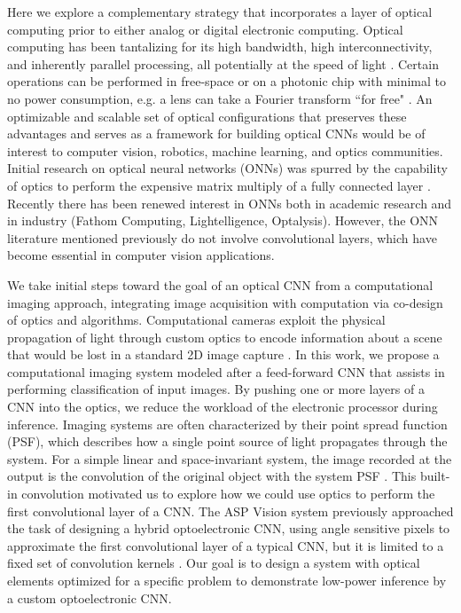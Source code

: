 \documentclass[fleqn,10pt]{wlscirep}
\begin{document}
Here we explore a complementary strategy that incorporates a layer of optical computing prior to either analog or digital electronic computing. Optical computing has been tantalizing for its high bandwidth, high interconnectivity, and inherently parallel processing, all potentially at the speed of light \cite{denz2013optical}. Certain operations can be performed in free-space or on a photonic chip with minimal to no power consumption, e.g. a lens can take a Fourier transform ``for free" \cite{yang2013chip,goodman2008introduction}.  An optimizable and scalable set of optical configurations that preserves these advantages and serves as a framework for building optical CNNs would be of interest to computer vision, robotics, machine learning, and optics communities. Initial research on optical neural networks (ONNs) was spurred by the capability of optics to perform the expensive matrix multiply of a fully connected layer \cite{farhat1985optical,psaltis1988adaptive,lu1989two,saxena1995adaptive}. Recently there has been renewed interest in ONNs both in academic research \cite{shen2017deep,bueno2017reinforcement}and in industry (Fathom Computing, Lightelligence, Optalysis). However, the ONN literature mentioned previously do not involve convolutional layers, which have become essential in computer vision applications. 

We take initial steps toward the goal of an optical CNN from a computational imaging approach, integrating image acquisition with computation via co-design of optics and algorithms. Computational cameras exploit the physical propagation of light through custom optics to encode information about a scene that would be lost in a standard 2D image capture \cite{ng2005light,levin2007image,mcguire2007optical,o2010optical,chang2016variable}. In this work, we propose a computational imaging system modeled after a feed-forward CNN that assists in performing classification of input images. By pushing one or more layers of a CNN into the optics, we reduce the workload of the electronic processor during inference. Imaging systems are often characterized by their point spread function (PSF), which describes how a single point source of light propagates through the system. For a simple linear and space-invariant system, the image recorded at the output is the convolution of the original object with the system PSF \cite{goodman2008introduction}. This built-in convolution motivated us to explore how we could use optics to perform the first convolutional layer of a CNN. The ASP Vision system previously approached the task of designing a hybrid optoelectronic CNN, using angle sensitive pixels to approximate the first convolutional layer of a typical CNN, but it is limited to a fixed set of convolution kernels \cite{chen2016asp}. Our goal is to design a system with optical elements optimized for a specific problem to demonstrate low-power inference by a custom optoelectronic CNN.
\end{document}
